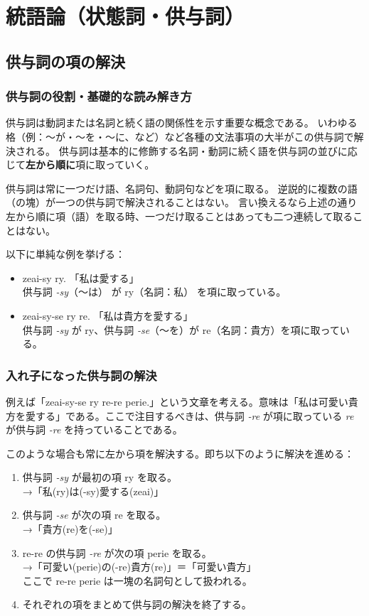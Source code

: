\chapter{統語論（状態詞・供与詞）}

\section{供与詞の項の解決}

\subsection{供与詞の役割・基礎的な読み解き方}

供与詞は動詞または名詞と続く語の関係性を示す重要な概念である。
いわゆる格（例：～が・～を・～に、など）など各種の文法事項の大半がこの供与詞で解決される。
供与詞は基本的に修飾する名詞・動詞に続く語を供与詞の並びに応じて\textbf{左から順に}項に取っていく。

供与詞は常に一つだけ語、名詞句、動詞句などを項に取る。
逆説的に複数の語（の塊）が一つの供与詞で解決されることはない。
言い換えるなら上述の通り左から順に項（語）を取る時、一つだけ取ることはあっても二つ連続して取ることはない。

以下に単純な例を挙げる：

\begin{itemize}
    \item zeai-sy ry. 「私は愛する」\\ 供与詞 \emph{-sy}（～は） が ry（名詞：私） を項に取っている。
    \item zeai-sy-se ry re. 「私は貴方を愛する」\\ 供与詞 \emph{-sy} が ry、供与詞 \emph{-se}（～を）が re（名詞：貴方）を項に取っている。
\end{itemize}

\subsection{入れ子になった供与詞の解決}

例えば「zeai-sy-se ry re-re perie.」という文章を考える。意味は「私は可愛い貴方を愛する」である。ここで注目するべきは、供与詞 \emph{-re} が項に取っている \emph{re} が供与詞 \emph{-re} を持っていることである。

このような場合も常に左から項を解決する。即ち以下のように解決を進める：

\begin{enumerate}
    \item 供与詞 \emph{-sy} が最初の項 ry を取る。\\ →「私(ry)は(-sy)愛する(zeai)」
    \item 供与詞 \emph{-se} が次の項 re を取る。 \\ →「貴方(re)を(-se)」
    \item re-re の供与詞 \emph{-re} が次の項 perie を取る。 \\ →「可愛い(perie)の(-re)貴方(re)」＝「可愛い貴方」\\ ここで re-re perie は一塊の名詞句として扱われる。
    \item それぞれの項をまとめて供与詞の解決を終了する。
\end{enumerate}

